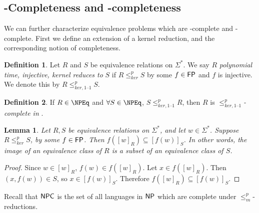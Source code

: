 \documentclass{article}
\newtheorem{lemma}[lemma]{Lemma}
\theoremstyle{definition} \newtheorem{definition}[definition]{Definition}
\newcommand{\sigmastar}{\Sigma^{*}} %
\newcommand{\kr}{\leq^{p}_{ker}} %
\newcommand{\kri}{\leq^{p}_{ker,1\text{--}1}} %
\newcommand{\mor}{\leq^{p}_{m}} %
\newcommand{\defn}[1]{\emph{#1}} %
\begin{document}

\subsection{\texorpdfstring{\NP}{NP}-Completeness and
  \texorpdfstring{\NPEq}{NPEq}-completeness}

We can further characterize equivalence problems which are \NP-complete and
\NPEq-complete. First we define an extension of a kernel reduction, and the
corresponding notion of completeness.

\begin{definition}
  Let $R$ and $S$ be equivalence relations on $\sigmastar$. We say $R$
  \defn{polynomial time, injective, kernel reduces to} $S$ if $R\kr S$ by some
  $f\in{\ensuremath{\mathsf{FP}}}$ and $f$ is injective. We denote this by $R\kri S$.
\end{definition}

\begin{definition}
  If $R\in\NPEq$ and $\forall S\in\NPEq$, $S\kri R$, then $R$ is
  \defn{$\kri$-complete in \NPEq}.
\end{definition}

\begin{lemma}\label{lem:image}
  Let $R,S$ be equivalence relations on $\sigmastar$, and let
  $w\in\sigmastar$. Suppose $R\kr S$, by some $f\in{\ensuremath{\mathsf{FP}}}$. Then
  $f([w]_R)\subseteq [f(w)]_S$. In other words, the image of an equivalence
  class of $R$ is a subset of an equivalence class of $S$.
\end{lemma}
\begin{proof}
  Since $w\in [w]_R$, $f(w)\in f([w]_R)$. Let $x\in f([w]_R)$. Then $(x,
  f(w))\in S$, so $x\in [f(w)]_S$. Therefore $f([w]_R)\subseteq [f(w)]_S$.
\end{proof}


Recall that ${\mathsf{NPC}}$ is the set of all languages in ${\mathsf{NP}}$ which
are complete under $\mor$-reductions.
\end{document}
